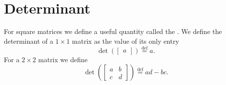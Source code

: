 
\section{Determinant}
\label{det:section}



For square matrices we define a useful quantity called the
\emph{}.  We define
the determinant of a $1 \times 1$ matrix as the value of its only entry
\begin{equation*}
\det \left(
\begin{bmatrix}
a 
\end{bmatrix}
\right)
\overset{\text{def}}{=}
a .
\end{equation*}
For a $2 \times 2$ matrix we define
\begin{equation*}
\det \left(
\begin{bmatrix}
a & b \\
c & d
\end{bmatrix}
\right)
\overset{\text{def}}{=}
ad-bc .
\end{equation*}

